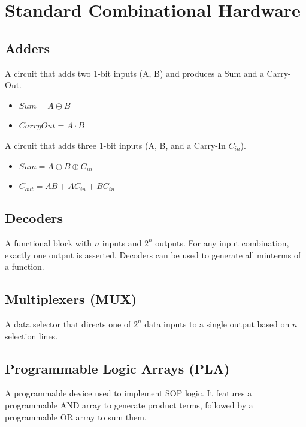 \section{Standard Combinational Hardware}

\subsection{Adders}
\begin{definition}
A circuit that adds two 1-bit inputs (A, B) and produces a Sum and a Carry-Out.
\begin{itemize}
    \item $Sum = A \oplus B$
    \item $CarryOut = A \cdot B$
\end{itemize}
\end{definition}

\begin{definition}
A circuit that adds three 1-bit inputs (A, B, and a Carry-In $C_{in}$).
\begin{itemize}
    \item $Sum = A \oplus B \oplus C_{in}$
    \item $C_{out} = AB + AC_{in} + BC_{in}$
\end{itemize}
\end{definition}

\subsection{Decoders}
\begin{definition}[Decoder]
A functional block with $n$ inputs and $2^n$ outputs. For any input combination, exactly one output is asserted. Decoders can be used to generate all minterms of a function.
\end{definition}

\subsection{Multiplexers (MUX)}
\begin{definition}[Multiplexer]
A data selector that directs one of $2^n$ data inputs to a single output based on $n$ selection lines.
\end{definition}

\subsection{Programmable Logic Arrays (PLA)}
\begin{definition}[PLA]
A programmable device used to implement SOP logic. It features a programmable AND array to generate product terms, followed by a programmable OR array to sum them.
\end{definition}

